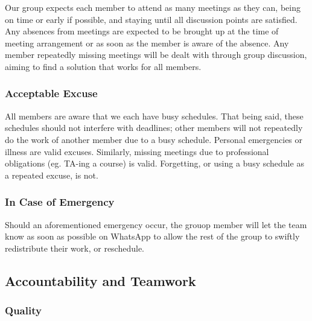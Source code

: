 \documentclass{article}
\begin{document}
Our group expects each member to attend as many meetings as they can, being on time 
or early if possible, and staying until all discussion points are satisfied. Any 
absences from meetings are expected to be brought up at the time of meeting arrangement 
or as soon as the member is aware of the absence. Any member repeatedly missing meetings 
will be dealt with through group discussion, aiming to find a solution that works for all members.

\subsubsection*{Acceptable Excuse}

\iffalse
\wss{What constitutes an acceptable excuse for missing a meeting or a deadline?
What types of excuses will not be considered acceptable?}
\fi

All members are aware that we each have busy schedules. That being said, these 
schedules should not interfere with deadlines; other members will not repeatedly 
do the work of another member due to a busy schedule. Personal emergencies or illness 
are valid excuses. Similarly, missing meetings due to professional obligations (eg. 
TA-ing a course) is valid. Forgetting, or using a busy schedule as a repeated excuse, is not.

\subsubsection*{In Case of Emergency}

\iffalse
\wss{What process will team members follow if they have an emergency and cannot
attend a team meeting or complete their individual work promised for a team
deliverable?}
\fi

Should an aforementioned emergency occur, the grouop member will let the team know as 
soon as possible on WhatsApp to allow the rest of the group to swiftly redistribute 
their work, or reschedule.

\subsection*{Accountability and Teamwork}

\subsubsection*{Quality} 

\end{document}
